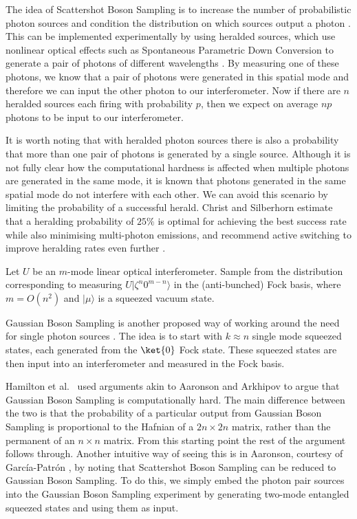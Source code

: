The idea of Scattershot Boson Sampling is to increase the number of probabilistic photon sources and condition the distribution on which sources output a photon \cite{aaronson2013, lund2014}. This can be implemented experimentally by using heralded sources, which use nonlinear optical effects such as Spontaneous Parametric Down Conversion to generate a pair of photons of different wavelengths \cite{loudon2006}. By measuring one of these photons, we know that a pair of photons were generated in this spatial mode and therefore we can input the other photon to our interferometer. Now if there are $n$ heralded sources each firing with probability $p$, then we expect on average $np$ photons to be input to our interferometer.

It is worth noting that with heralded photon sources there is also a probability that more than one pair of photons is generated by a single source. Although it is not fully clear how the computational hardness is affected when multiple photons are generated in the same mode, it is known that photons generated in the same spatial mode do not interfere with each other. We can avoid this scenario by limiting the probability of a successful herald. Christ and Silberhorn estimate that a heralding probability of $25\%$ is optimal for achieving the best success rate while also minimising multi-photon emissions, and recommend active switching to improve heralding rates even further \cite{christ2012}.

\begin{problem} Let $U$ be an $m$-mode linear optical interferometer. Sample from the distribution corresponding to measuring $U|\zeta^n0^{m-n}\rangle$ in the (anti-bunched) Fock basis, where $m=O(n^2)$ and $|\mu\rangle$ is a squeezed vacuum state.
\end{problem}

Gaussian Boson Sampling is another proposed way of working around the need for single photon sources \cite{hamilton2017}. The idea is to start with $k\approx n$ single mode squeezed states, each generated from the $\ket{0}$ Fock state. These squeezed states are then input into an interferometer and measured in the Fock basis.

Hamilton et al.~\cite{hamilton2017} used arguments akin to Aaronson and Arkhipov to argue that Gaussian Boson Sampling is computationally hard. The main difference between the two is that the probability of a particular output from Gaussian Boson Sampling is proportional to the Hafnian of a $2n\times 2n$ matrix, rather than the permanent of an $n\times n$ matrix. From this starting point the rest of the argument follows through. Another intuitive way of seeing this is in Aaronson, courtesy of Garc\'{i}a-Patr\'{o}n \cite{aaronson2013}, by noting that Scattershot Boson Sampling can be reduced to Gaussian Boson Sampling. To do this, we simply embed the photon pair sources into the Gaussian Boson Sampling experiment by generating two-mode entangled squeezed states and using them as input.

